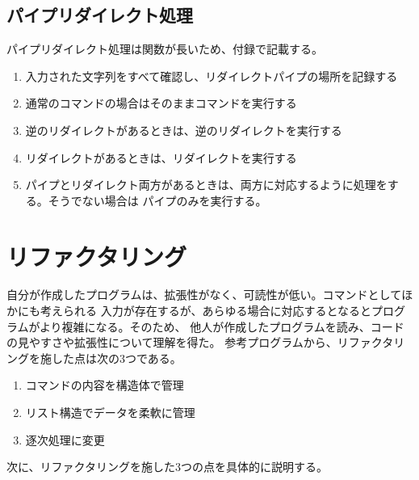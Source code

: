 \documentclass[a4j, twocolumn]{ltjsarticle}
\begin{document}
      \subsection{パイプリダイレクト処理}
      パイプリダイレクト処理は関数が長いため、付録で記載する。
      \begin{enumerate}
        \item 入力された文字列をすべて確認し、リダイレクトパイプの場所を記録する
        \item 通常のコマンドの場合はそのままコマンドを実行する
        \item 逆のリダイレクトがあるときは、逆のリダイレクトを実行する
        \item リダイレクトがあるときは、リダイレクトを実行する
        \item パイプとリダイレクト両方があるときは、両方に対応するように処理をする。そうでない場合は
        パイプのみを実行する。
      \end{enumerate}

  \section{リファクタリング}
    自分が作成したプログラムは、拡張性がなく、可読性が低い。コマンドとしてほかにも考えられる
    入力が存在するが、あらゆる場合に対応するとなるとプログラムがより複雑になる。そのため、
    他人が作成したプログラムを読み、コードの見やすさや拡張性について理解を得た。
    参考プログラムから、リファクタリングを施した点は次の3つである。
    \begin{enumerate}
      \item コマンドの内容を構造体で管理
      \item リスト構造でデータを柔軟に管理
      \item 逐次処理に変更
    \end{enumerate}
    次に、リファクタリングを施した3つの点を具体的に説明する。
\end{document}
